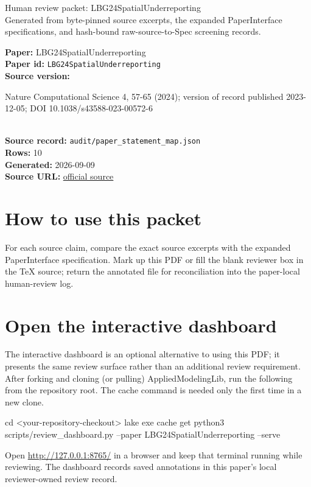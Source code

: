 \documentclass[10pt]{article}
\begin{document}
\fontsize{9}{10}\selectfont

\begin{center}
{\LARGE Human review packet: LBG24SpatialUnderreporting}\\[0.35em]
\small Generated from byte-pinned source excerpts, the expanded PaperInterface
specifications, and hash-bound raw-source-to-Spec screening records.
\end{center}

\noindent\textbf{Paper:} LBG24SpatialUnderreporting\\
\textbf{Paper id:} \texttt{LBG24SpatialUnderreporting}\\
\textbf{Source version:} \parbox[t]{0.76\linewidth}{\raggedright Nature Computational Science 4, 57-65 (2024); version of record published 2023-12-05; DOI 10.1038/s43588-023-00572-6}\\
\textbf{Source record:} \texttt{audit/paper\_statement\_map.json}\\
\textbf{Rows:} 10\\
\textbf{Generated:} 2026-09-09\\
\textbf{Source URL:} \href{https://arxiv.org/pdf/2204.08620}{official source}





\section*{How to use this packet}
For each source claim, compare the exact source excerpts with the expanded
PaperInterface specification. Mark up this PDF or fill the blank reviewer box in the TeX source;
return the annotated file for reconciliation into the paper-local human-review
log.

\section*{Open the interactive dashboard}
The interactive dashboard is an optional alternative to using this PDF; it
presents the same review surface rather than an additional review requirement.
After forking and cloning (or pulling) AppliedModelingLib, run the following from the
repository root. The cache command is needed only the first time in a new clone.
\begin{ReviewVerbatim}
cd <your-repository-checkout>
lake exe cache get
python3 scripts/review_dashboard.py --paper LBG24SpatialUnderreporting --serve
\end{ReviewVerbatim}
Open \url{http://127.0.0.1:8765/} in a browser and keep that terminal running
while reviewing. The dashboard records saved annotations in this paper's local
reviewer-owned review record.
\end{document}
